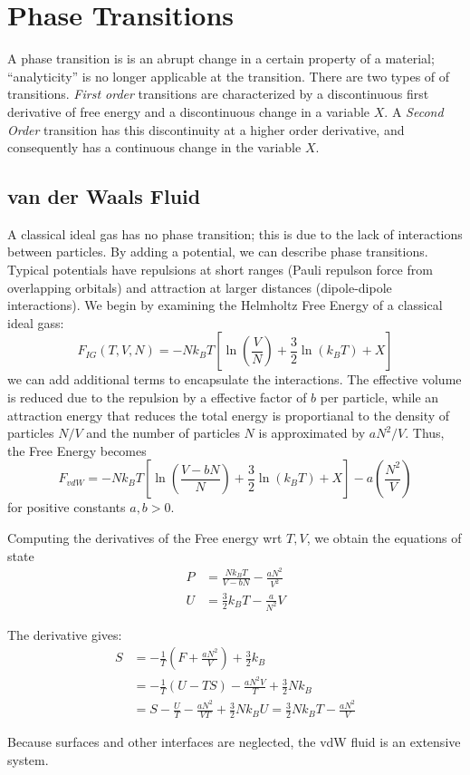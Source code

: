 \chapter{Phase Transitions}
A phase transition is is an abrupt change in a certain property of a material; ``analyticity'' is no longer applicable at the transition. There are two types of of transitions. \emph{First order} transitions are characterized by a discontinuous first derivative of free energy and a discontinuous change in a variable \(X\). A \emph{Second Order} transition has this discontinuity at a higher order derivative, and consequently has a continuous change in the variable \(X\).

\section{van der Waals Fluid}
A classical ideal gas has no phase transition; this is due to the lack of interactions between particles. By adding a potential, we can describe phase transitions. Typical potentials have repulsions at short ranges (Pauli repulson force from overlapping orbitals) and attraction at larger distances (dipole-dipole interactions). We begin by examining the Helmholtz Free Energy of a classical ideal gass:
\[F_{IG}(T,V,N)=-Nk_B T \left[\ln\left(\frac{V}{N}\right)+\frac{3}{2}\ln\left(k_B T\right)+X\right]\]
we can add additional terms to encapsulate the interactions. The effective volume is reduced due to the repulsion by a effective factor of \(b\) per particle, while an attraction energy that reduces the total energy is proportianal to the density of particles \(N/V\) and the number of particles \(N\) is approximated by \(aN^2/V\). Thus, the Free Energy becomes
\begin{equation}
	F_{vdW} = -Nk_BT\left[\ln\left(\frac{V-bN}N\right)+\frac{3}{2}\ln(k_BT) + X \right]-a\left(\frac{N^2}{V}\right)
\end{equation}
for positive constants \(a,b>0\).

Computing the derivatives of the Free energy wrt \(T,V\), we obtain the equations of state
\begin{subequations}
	\begin{align}
		P&=\frac{Nk_BT}{V-bN}-\frac{aN^2}{V^2}\\
		U&=\frac{3}{2}k_BT - \frac{a}{N^2}{V}
	\end{align}
\end{subequations}

\begin{aside}
	The derivative gives:
	\begin{align*}
		S&=-\frac{1}{T}\left(F+\frac{aN^2}{V}\right)+\frac{3}{2}k_B\\
		 &=-\frac{1}{T}(U-TS)-\frac{aN^2V}{T}+\frac{3}{2}Nk_B\\
		 &= S -\frac{U}{T} -\frac{aN^2}{VT}+\frac{3}{2}Nk_B
		 U=\frac{3}{2}Nk_BT -\frac{aN^2}{V}
	\end{align*}
\end{aside}
Because surfaces and other interfaces are neglected, the vdW fluid is an extensive system.

